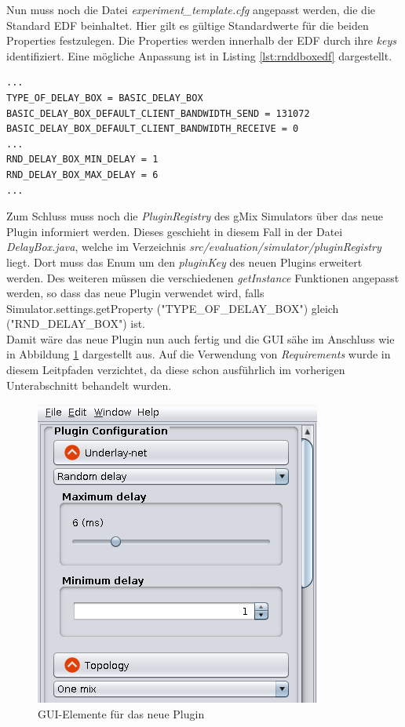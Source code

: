 \documentclass[a4paper, 11pt]{article} %
\begin{document}
Nun muss noch die Datei \emph{experiment\_template.cfg} angepasst werden, die die Standard EDF beinhaltet. Hier gilt es gültige Standardwerte für die beiden Properties festzulegen. Die Properties werden innerhalb der EDF durch ihre \emph{keys} identifiziert. Eine mögliche Anpassung ist in Listing \ref{lst:rnddboxedf} dargestellt.

\begin{lstlisting}[caption={Auszug aus der neuen experiment\_template.cfg}, label=lst:rnddboxedf]
...
TYPE_OF_DELAY_BOX = BASIC_DELAY_BOX
BASIC_DELAY_BOX_DEFAULT_CLIENT_BANDWIDTH_SEND = 131072
BASIC_DELAY_BOX_DEFAULT_CLIENT_BANDWIDTH_RECEIVE = 0
...
RND_DELAY_BOX_MIN_DELAY = 1
RND_DELAY_BOX_MAX_DELAY = 6
...
\end{lstlisting}

Zum Schluss muss noch die \emph{PluginRegistry} des gMix Simulators über das neue Plugin informiert werden. Dieses geschieht in diesem Fall in der Datei \emph{DelayBox.java}, welche im Verzeichnis \emph{src/evaluation/simulator/pluginRegistry} liegt. Dort muss das Enum um den \emph{pluginKey} des neuen Plugins erweitert werden. Des weiteren müssen die verschiedenen \emph{getInstance} Funktionen angepasst werden, so dass das neue Plugin verwendet wird, falls Simulator.settings.getProperty ("TYPE\_OF\_DELAY\_BOX") gleich ("RND\_DELAY\_BOX") ist.\\

Damit wäre das neue Plugin nun auch fertig und die GUI sähe im Anschluss wie in Abbildung \ref{fig:rnddbox} dargestellt aus. Auf die Verwendung von \emph{Requirements} wurde in diesem Leitpfaden verzichtet, da diese schon ausführlich im vorherigen Unterabschnitt behandelt wurden.

\begin{figure}[!htp]
\centering
\includegraphics[scale=0.56]{img/rnddbox.png}

\caption{GUI-Elemente für das neue Plugin}
\label{fig:rnddbox}
\end{figure}
\end{document}
